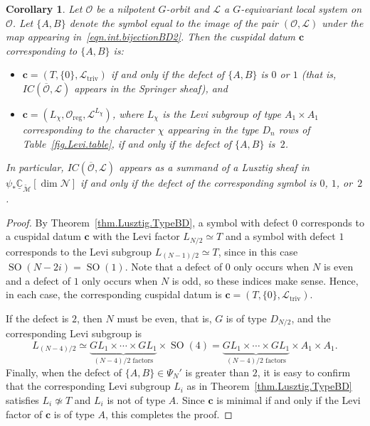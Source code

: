 \documentclass[reqno,11pt]{amsart}
\newtheorem{Cor}[Thm]{Corollary}
\theoremstyle{remark}
\theoremstyle{remark}
\theoremstyle{definition}
\theoremstyle{definition}
\theoremstyle{definition}
\numberwithin{equation}{section}
\newcommand{\C}{\mathbb{C}}           %
\newcommand{\SO}{\operatorname{SO}}
\newcommand{\cl}{\mathcal{L}}
\newcommand{\cm}{\mathcal{M}}
\newcommand{\cn}{\mathcal{N}}
\newcommand{\co}{\mathcal{O}}
\newcommand{\shc}{\underline{\C}}
\renewcommand{\tilde}{\widetilde}
\newcommand{\reg}{\mathrm{reg}}
\begin{document}
\begin{Cor}\label{cor.defectBD} Let $\co$ be a nilpotent $G$-orbit and $\cl$ a $G$-equivariant local system on $\co$.  Let $\{A,B\}$ denote the symbol equal to the image of the pair $(\co, \cl)$ under the map appearing in~\eqref{eqn.int.bijectionBD2}.  Then the cuspidal datum $\mathbf{c}$ corresponding to $\{A,B\}$ is: 
\begin{itemize}
\item $\mathbf{c}=(T, \{0\}, \cl_\mathrm{triv})$ if and only if the defect of $\{A,B\}$ is $0$ or $1$ (that is, $IC(\overline{\co}, \cl)$ appears in the Springer sheaf), and 
\item $\mathbf{c} = (L_\chi, \co_{\reg}, \cl^{L_\chi})$, where $L_\chi$ is the Levi subgroup of type $A_1\times A_1$ corresponding to the character $\chi$ appearing in the type $D_n$ rows of Table~\ref{fig.Levi.table}, if and only if the defect of $\{A,B\}$ is~$2$.  
\end{itemize}
In particular, $IC(\overline{\co}, \cl)$ appears as a summand of a Lusztig sheaf in $\psi_*\shc_{\tilde{\cm}}[\dim \cn]$ if and only if the defect of the corresponding symbol is $0$, $1$, or~$2$.
\end{Cor}
\begin{proof} 

By Theorem~\ref{thm.Lusztig.TypeBD}, a symbol with defect $0$ corresponds to a cuspidal datum $\mathbf{c}$ with the Levi factor
$L_{N/2} \simeq T$ and a symbol with defect $1$ corresponds to the Levi subgroup $L_{(N-1)/2} \simeq T$, since in this case $\SO(N-2i) = \SO(1)$. Note that a defect of $0$ only occurs when $N$ is even and a defect of $1$ only occurs when $N$ is odd, so these indices make sense.   Hence, in each case, the corresponding cuspidal
datum is $\mathbf{c}=(T, \{0\}, \cl_\mathrm{triv})$.   

If the defect is $2$, then $N$ must be even, that is, $G$ is of type $D_{N/2}$, and the corresponding Levi subgroup
is 
\[
L_{(N-4)/2}\simeq \underbrace{GL_1\times \cdots \times GL_1}_{\text{$(N-4)/2$ factors}}\times  \SO(4) = \underbrace{GL_1\times \cdots \times GL_1}_{\text{$(N-4)/2$ factors}}\times  A_1\times A_1.
\]
Finally, when the defect of $\{A,B\} \in \Psi_N'$ is greater than $2$, it is easy to confirm that the corresponding Levi subgroup $L_i$ as in Theorem~\ref{thm.Lusztig.TypeBD} satisfies $L_i\not\simeq T$ and $L_i$ is not of type $A$. Since $\mathbf{c}$ is minimal if and only if the Levi factor of $\mathbf{c}$ is of type $A$, this completes the proof. 
\end{proof}
\end{document}
